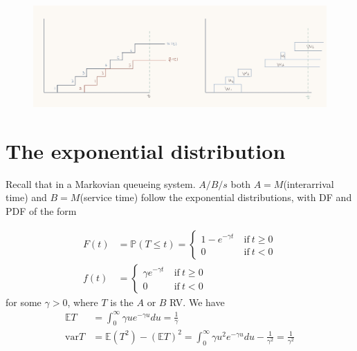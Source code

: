 \begin{figure}[H]
    \centering
    \includegraphics[width=\textwidth]{document/4-1.jpg}
\end{figure}

\section{The exponential distribution}
Recall that in a Markovian queueing system. $A/B/s$ both $A=M$(interarrival time) and $B = M$(service time) follow the exponential distributions, with DF and PDF of the form

\begin{align*}
    F(t) &= \mathbb{P}(T\leqslant t) = \left\lbrace\begin{array}{ll}
        1 - e^{-\gamma t} &\ \text{if}\ t\geqslant 0 \\
        0 & \ \text{if} \ t<0
    \end{array} \right. \\
    f(t) & = \left\lbrace\begin{array}{ll}
        \gamma e^{-\gamma t} &\ \text{if}\ t\geqslant 0 \\
        0 & \ \text{if} \ t<0
    \end{array} \right.
\end{align*}
for some $\gamma>0$, where $T$ is the $A$ or $B$ RV. We have 
\begin{align*}
    \mathbb{E} T &= \int_0^{\infty} \gamma u e^{-\gamma u} du = \frac{1}{\gamma} \\
    \text{var} T &= \mathbb{E}(T^2) - (\mathbb{E} T)^2 = \int_0^{\infty} \gamma u^2 e^{-\gamma u} du - \frac{1}{\gamma^2} = \frac{1}{\gamma^2}
\end{align*}

